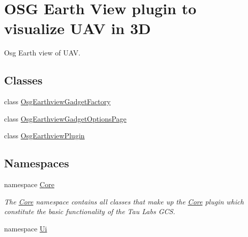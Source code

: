 \hypertarget{group___o_s_g_earth_view_pluging}{\section{\-O\-S\-G \-Earth \-View plugin to visualize \-U\-A\-V in 3\-D}
\label{group___o_s_g_earth_view_pluging}
}


\-Osg \-Earth view of \-U\-A\-V.  


\subsection*{\-Classes}
\begin{DoxyCompactItemize}
\item 
class \hyperlink{class_osg_earthview_gadget_factory}{\-Osg\-Earthview\-Gadget\-Factory}
\item 
class \hyperlink{class_osg_earthview_gadget_options_page}{\-Osg\-Earthview\-Gadget\-Options\-Page}
\item 
class \hyperlink{class_osg_earthview_plugin}{\-Osg\-Earthview\-Plugin}
\end{DoxyCompactItemize}
\subsection*{\-Namespaces}
\begin{DoxyCompactItemize}
\item 
namespace \hyperlink{namespace_core}{\-Core}
\begin{DoxyCompactList}\small\item\em \-The \hyperlink{namespace_core}{\-Core} namespace contains all classes that make up the \hyperlink{namespace_core}{\-Core} plugin which constitute the basic functionality of the \-Tau \-Labs \-G\-C\-S. \end{DoxyCompactList}\item 
namespace \hyperlink{namespace_ui}{\-Ui}
\end{DoxyCompactItemize}
